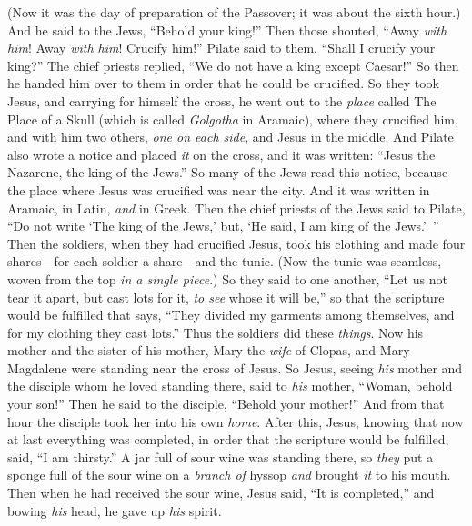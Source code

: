 \begin{biblechapter}
\verse (Now it was the day of preparation of the Passover; it was about the sixth hour.) And he said to the Jews, “Behold your king!”
\verse Then those shouted, “Away \textit{with him}! Away \textit{with him}! Crucify him!” Pilate said to them, “Shall I crucify your king?” The chief priests replied, “We do not have a king except Caesar!”
\verse So then he handed him over to them in order that he could be crucified.
 So they took Jesus,
\verse and carrying for himself the cross, he went out to the \textit{place} called The Place of a Skull (which is called \textit{Golgotha} in Aramaic),
\verse where they crucified him, and with him two others, \textit{one on each side}, and Jesus in the middle.
\verse And Pilate also wrote a notice and placed \textit{it} on the cross, and it was written: “Jesus the Nazarene, the king of the Jews.”
\verse So many of the Jews read this notice, because the place where Jesus was crucified was near the city. And it was written in Aramaic, in Latin, \textit{and} in Greek.
\verse Then the chief priests of the Jews said to Pilate, “Do not write ‘The king of the Jews,’ but, ‘He said, I am king of the Jews.’ ”
\verse Then the soldiers, when they had crucified Jesus, took his clothing and made four shares—for each soldier a share—and the tunic. (Now the tunic was seamless, woven from the top \textit{in a single piece}.)
\verse So they said to one another, “Let us not tear it apart, but cast lots for it, \textit{to see} whose it will be,” so that the scripture would be fulfilled that says, “They divided my garments among themselves, 
and for my clothing they cast lots.” Thus the soldiers did these \textit{things}.
\verse Now his mother and the sister of his mother, Mary the \textit{wife} of Clopas, and Mary Magdalene were standing near the cross of Jesus.
\verse So Jesus, seeing \textit{his} mother and the disciple whom he loved standing there, said to \textit{his} mother, “Woman, behold your son!”
\verse Then he said to the disciple, “Behold your mother!” And from that hour the disciple took her into his own \textit{home}.
 After this, Jesus, knowing that now at last everything was completed, in order that the scripture would be fulfilled, said, “I am thirsty.”
\verse A jar full of sour wine was standing there, so \textit{they} put a sponge full of the sour wine on a \textit{branch of} hyssop \textit{and} brought \textit{it} to his mouth.
\verse Then when he had received the sour wine, Jesus said, “It is completed,” and bowing \textit{his} head, he gave up \textit{his} spirit.

\end{biblechapter}
